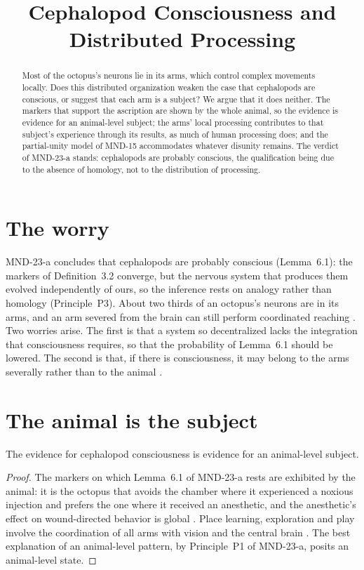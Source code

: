 \documentclass{situationist-preprint}
\title{Cephalopod Consciousness and Distributed Processing}
\begin{document}
\maketitle

\begin{abstract}
Most of the octopus's neurons lie in its arms, which control complex movements locally. Does this distributed organization weaken the case that cephalopods are conscious, or suggest that each arm is a subject? We argue that it does neither. The markers that support the ascription are shown by the whole animal, so the evidence is evidence for an animal-level subject; the arms' local processing contributes to that subject's experience through its results, as much of human processing does; and the partial-unity model of MND-15 accommodates whatever disunity remains. The verdict of MND-23-a stands: cephalopods are probably conscious, the qualification being due to the absence of homology, not to the distribution of processing.
\end{abstract}

\section{The worry}

MND-23-a concludes that cephalopods are probably conscious (Lemma~6.1): the markers of Definition~3.2 converge, but the nervous system that produces them evolved independently of ours, so the inference rests on analogy rather than homology (Principle~P3). About two thirds of an octopus's neurons are in its arms, and an arm severed from the brain can still perform coordinated reaching \citep{Hochner2012}. Two worries arise. The first is that a system so decentralized lacks the integration that consciousness requires, so that the probability of Lemma~6.1 should be lowered. The second is that, if there is consciousness, it may belong to the arms severally rather than to the animal \citep{GodfreySmith2016}.

\section{The animal is the subject}

\begin{proposition}\label{p:animal}
The evidence for cephalopod consciousness is evidence for an animal-level subject.
\end{proposition}

\begin{proof}
The markers on which Lemma~6.1 of MND-23-a rests are exhibited by the animal: it is the octopus that avoids the chamber where it experienced a noxious injection and prefers the one where it received an anesthetic, and the anesthetic's effect on wound-directed behavior is global \citep{Crook2021}. Place learning, exploration and play involve the coordination of all arms with vision and the central brain \citep{Mather2008}. The best explanation of an animal-level pattern, by Principle~P1 of MND-23-a, posits an animal-level state.
\end{proof}
\end{document}
